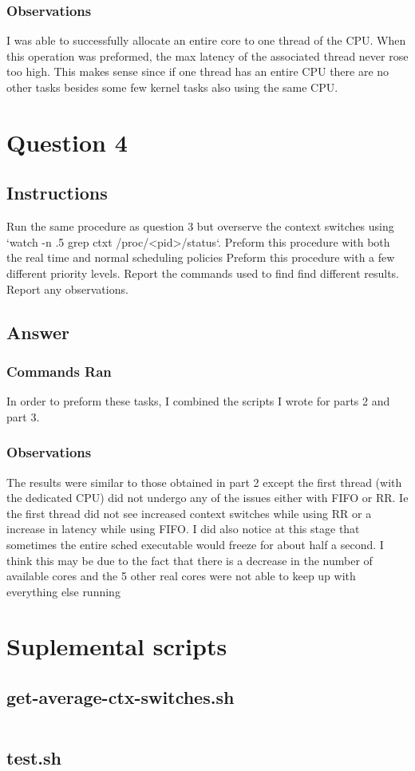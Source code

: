 \documentclass{assignment-x}
\begin{document}
\subsubsection{Observations}
I was able to successfully allocate an entire core to one thread of the CPU. When this operation was preformed, the max latency of the associated thread never rose too high. This makes sense since if one thread has an entire CPU there are no other tasks besides some few kernel tasks also using the same CPU.

\section{Question 4}
\subsection{Instructions}
Run the same procedure as question 3 but overserve the context switches using `watch -n .5 grep ctxt /proc/<pid>/status`. 
Preform this procedure with both the real time and normal scheduling policies
Preform this procedure with a few different priority levels.
Report the commands used to find find different results.
Report any observations.
\subsection{Answer}
\subsubsection{Commands Ran}
In order to preform these tasks, I combined the scripts I wrote for parts 2 and part 3. 
\subsubsection{Observations}
The results were similar to those obtained in part 2 except the first thread (with the dedicated CPU) did not undergo any of the issues either with FIFO or RR. Ie the first thread did not see increased context switches while using RR or a increase in latency while using FIFO. I did also notice at this stage that sometimes the entire sched executable would freeze for about half a second. I think this may be due to the fact that there is a decrease in the number of available cores and the 5 other real cores were not able to keep up with everything else running

\section{Suplemental scripts}
\subsection{get-average-ctx-switches.sh}
\inputminted{bash}{../get-average-ctx-switches.sh}
\subsection{test.sh}
\inputminted{bash}{../test.sh}
\end{document}
